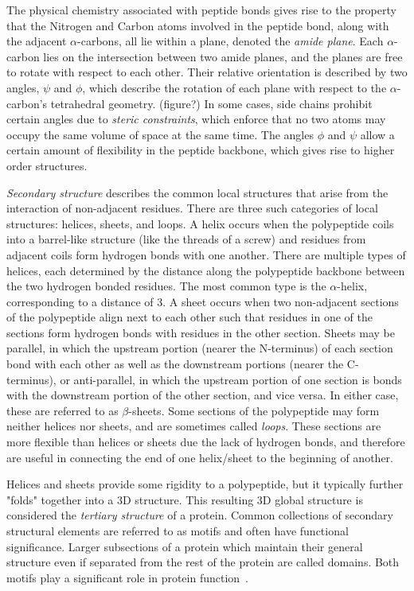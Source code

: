 The physical chemistry associated with peptide bonds gives rise to the property that the Nitrogen and Carbon atoms involved in the peptide bond, along with the adjacent $\alpha$-carbons, all lie within a plane, denoted the \textit{amide plane}.
Each $\alpha$-carbon lies on the intersection between two amide planes, and the planes are free to rotate with respect to each other. 
Their relative orientation is described by two angles, $\psi$ and $\phi$, which describe the rotation of each plane with respect to the $\alpha$-carbon's tetrahedral geometry. (figure?)
In some cases, side chains prohibit certain angles due to \textit{steric constraints}, which enforce that no two atoms may occupy the same volume of space at the same time.
The angles $\phi$ and $\psi$ allow a certain amount of flexibility in the peptide backbone, which gives rise to higher order structures.

\textit{Secondary structure} describes the common local structures that arise from the interaction of non-adjacent residues.
There are three such categories of local structures: helices, sheets, and loops.
A helix occurs when the polypeptide coils into a barrel-like structure (like the threads of a screw) and residues from adjacent coils form hydrogen bonds with one another.
There are multiple types of helices, each determined by the distance along the polypeptide backbone between the two hydrogen bonded residues.
The most common type is the $\alpha$-helix, corresponding to a distance of 3. 
A sheet occurs when two non-adjacent sections of the polypeptide align next to each other such that residues in one of the sections form hydrogen bonds with residues in the other section.
Sheets may be parallel, in which the upstream portion (nearer the N-terminus) of each section bond with each other as well as the downstream portions (nearer the C-terminus), or anti-parallel, in which the upstream portion of one section is bonds with the downstream portion of the other section, and vice versa.
In either case, these are referred to as $\beta$-sheets. 
Some sections of the polypeptide may form neither helices nor sheets, and are sometimes called \textit{loops}.
These sections are more flexible than helices or sheets due the lack of hydrogen bonds, and therefore are useful in connecting the end of one helix/sheet to the beginning of another.

Helices and sheets provide some rigidity to a polypeptide, but it typically further "folds" together into a 3D structure.
This resulting 3D global structure is considered the \textit{tertiary structure} of a protein.
Common collections of secondary structural elements are referred to as motifs and often have functional significance.
Larger subsections of a protein which maintain their general structure even if separated from the rest of the protein are called domains. Both motifs play a significant role in protein function~\cite{scheeffink2003}.

